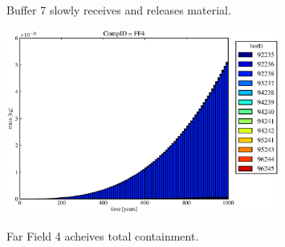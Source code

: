 \begin{frame}
\begin{figure}[ht]
\begin{minipage}[b]{0.45\linewidth}
  \caption[Case ODI Buffer Contaminants]{
    Buffer 7 slowly receives and releases material.
    }
  \includegraphics[width=0.8\textwidth]{./images/od0.eps}
  \caption[Case ODI Far FieldContaminants.]{ 
    Far Field 4 acheives total containment.
    }
  \label{fig:drIVwp6}
  \label{fig:drIVff0}


  \end{minipage}
\end{figure}
\end{frame}
